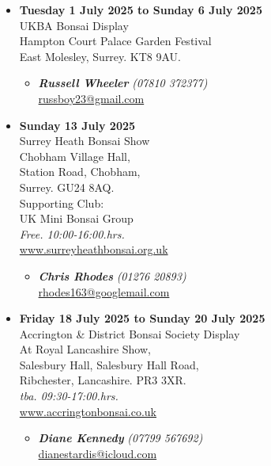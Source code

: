 \begin{itemize}
    \item \textbf{Tuesday 1 July 2025 to Sunday 6 July 2025}
    \\
    UKBA Bonsai Display \\
    Hampton Court Palace Garden Festival \\
    East Molesley, Surrey. KT8 9AU.
    \begin{itemize}
        \item \textbf{\emph{Russell Wheeler}} \emph{(07810 372377)} \\
        \href{mailto:russboy23@gmail.com}{russboy23@gmail.com} 
    \end{itemize}

    \item \textbf{Sunday 13 July 2025}
    \\
    Surrey Heath Bonsai Show \\
    Chobham Village Hall, \\
    Station Road, Chobham, \\
    Surrey. GU24 8AQ. \\
    Supporting Club: \\
    UK Mini Bonsai Group
    \\
    \emph{Free. 10:00-16:00.hrs.}
    \\
    \href{https://www.surreyheathbonsai.org.uk}{www.surreyheathbonsai.org.uk}
    \begin{itemize}
        \item \textbf{\emph{Chris Rhodes}} \emph{(01276 20893)} \\
        \href{mailto:rhodes163@googlemail.com}{rhodes163@googlemail.com} 
    \end{itemize}

    \item \textbf{Friday 18 July 2025 to Sunday 20 July 2025}
    \\
    Accrington \& District Bonsai Society Display \\
    At Royal Lancashire Show, \\
    Salesbury Hall, Salesbury Hall Road, \\
    Ribchester, Lancashire. PR3 3XR.
    \\
    \emph{tba. 09:30-17:00.hrs.}
    \\
    \href{https://www.accringtonbonsai.co.uk}{www.accringtonbonsai.co.uk}
    \begin{itemize}
        \item \textbf{\emph{Diane Kennedy}} \emph{(07799 567692)} \\
        \href{mailto:dianestardis@icloud.com}{dianestardis@icloud.com} 
    \end{itemize}


\end{itemize}
